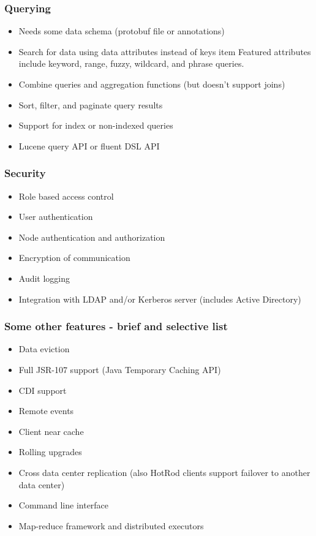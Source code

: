 \documentclass[10pt,utf8]{beamer}
\begin{document}
\begin{frame}
	\frametitle{Querying}
	\begin{itemize}
		\item Needs some data schema (protobuf file or annotations)
		\item Search for data using data attributes instead of keys
		item Featured attributes include keyword, range, fuzzy, wildcard, and phrase queries.
		\item Combine queries and aggregation functions (but doesn't support joins)
		\item Sort, filter, and paginate query results
		\item Support for index or non-indexed queries
		\item Lucene query API or fluent DSL API
	\end{itemize}
\end{frame}

\begin{frame}
	\frametitle{Security}
	\begin{itemize}
	 \item Role based access control
	 \item User authentication
	 \item Node authentication and authorization
	 \item Encryption of communication
	 \item Audit logging
	 \item Integration with LDAP and/or Kerberos server (includes Active Directory)
	\end{itemize}
\end{frame}


\begin{frame}
  \frametitle{Some other features - brief and selective list}
  \begin{itemize}
		\item Data eviction
		\item Full JSR-107 support (Java Temporary Caching API)
		\item CDI support
		\item Remote events
		\item Client near cache
		\item Rolling upgrades
		\item Cross data center replication (also HotRod clients support failover to another data center)
		\item Command line interface
		\item Map-reduce framework and distributed executors
  \end{itemize}
\end{frame}
\end{document}
